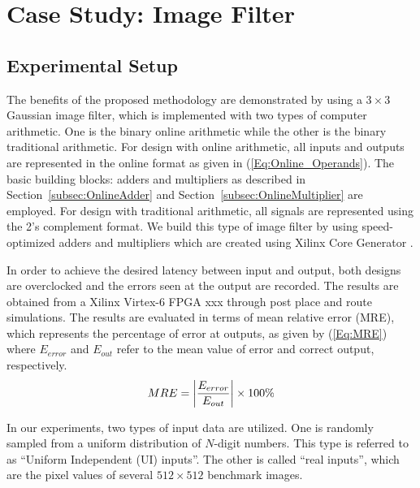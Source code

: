 \documentclass[journal]{IEEEtran}
\begin{document}
\section{Case Study: Image Filter}\label{Sec:CaseStudy}
\subsection{Experimental Setup}
The benefits of the proposed methodology are demonstrated by using a $3\times3$ Gaussian image filter, which is implemented with two types of computer arithmetic. One is the binary online arithmetic while the other is the binary traditional arithmetic. For design with online arithmetic, all inputs and outputs are represented in the online format as given in (\ref{Eq:Online_Operands}). The basic building blocks: adders and multipliers as described in Section~\ref{subsec:OnlineAdder} and Section~\ref{subsec:OnlineMultiplier} are employed. For design with traditional arithmetic, all signals are represented using the 2's complement format. We build this type of image filter by using speed-optimized adders and multipliers which are created using Xilinx Core Generator \cite{XilinxMult}. 

In order to achieve the desired latency between input and output, both designs are overclocked and the errors seen at the output are recorded. The results are obtained from a Xilinx Virtex-6 FPGA xxx through post place and route simulations. The results are evaluated in terms of mean relative error (MRE), which represents the percentage of error at outputs, as given by (\ref{Eq:MRE}) where $E_{error}$ and $E_{out}$ refer to the mean value of error and correct output, respectively.
%
\begin{eqnarray}\label{Eq:MRE}
\scriptsize
  MRE=\left|\frac{E_{error}}{E_{out}}\right|\times100\%
\end{eqnarray}
\normalsize

In our experiments, two types of input data are utilized. One is randomly sampled from a uniform distribution of $N$-digit numbers. This type is referred to as ``Uniform Independent (UI) inputs''. The other is called ``real inputs'', which are the pixel values of several $512\times512$ benchmark images.
\end{document}
